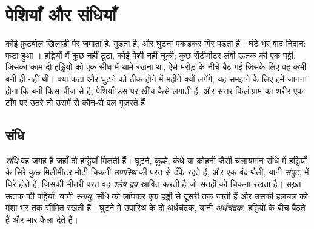 \chapter{पेशियाँ और संधियाँ}\label{ch:g10:muscles-and-joints}

कोई फ़ुटबॉल खिलाड़ी पैर जमाता है, मुड़ता है, और घुटना पकड़कर गिर पड़ता है।
घंटे भर बाद निदान: फटा हुआ । हड्डियों में कुछ नहीं टूटा, कोई पेशी
नहीं चूकी; कुछ सेंटीमीटर लंबी ऊतक की एक पट्टी, जिसका काम दो हड्डियों को
एक सीध में थामे रखना था, ऐसे मरोड़ के नीचे बैठ गई जिसके लिए वह कभी बनी ही
नहीं थी। क्या फटा और घुटने को ठीक होने में महीने क्यों लगेंगे, यह समझने
के लिए हमें जानना होगा कि  बनी किस चीज़ से है, पेशियाँ उस पर खींच कैसे
लगाती हैं, और सत्तर किलोग्राम का शरीर एक टाँग पर उतरे तो उसमें से कौन-से
बल गुज़रते हैं।

\section{संधि}

\begin{definition}[संधि]\label{def:g10:muscles-and-joints:joint}
\emph{संधि} वह जगह है जहाँ दो हड्डियाँ मिलती हैं। घुटने,
कूल्हे, कंधे या कोहनी जैसी चलायमान संधि में हड्डियों के सिरे कुछ
मिलीमीटर मोटी चिकनी \emph{उपास्थि} की परत से ढँके रहते
हैं, और एक बंद थैली, यानी \emph{संपुट}, में घिरे होते हैं, जिसकी भीतरी
परत वह \emph{श्लेष द्रव} स्रावित करती है जो सतहों को चिकना रखता है।
सख़्त ऊतक की पट्टियाँ, यानी \emph{स्नायु}, संधि को लाँघकर
एक हड्डी से दूसरी तक जाती हैं और उसकी हलचल को मंशा भर तक सीमित रखती हैं।
घुटने में उपास्थि के दो अर्धचंद्रक, यानी \emph{अर्धचंद्रक}, हड्डियों के
बीच बैठते हैं और भार फैला देते हैं।
\end{definition}

